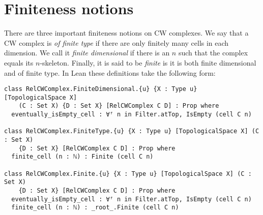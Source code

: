 \section{Finiteness notions}


There are three important finiteness notions on CW complexes. 
We say that a CW complex is \emph{of finite type} if there are only finitely many cells in each dimension. 
We call it \emph{finite dimensional} if there is an $n$ such that the complex equals its $n$-skeleton.
Finally, it is said to be \emph{finite} is it is both finite dimensional and of finite type. 
In Lean these definitions take the following form: 

\begin{lstlisting}[frame=single]
class RelCWComplex.FiniteDimensional.{u} {X : Type u} [TopologicalSpace X] 
    (C : Set X) {D : Set X} [RelCWComplex C D] : Prop where
  eventually_isEmpty_cell : ∀ᶠ n in Filter.atTop, IsEmpty (cell C n)

class RelCWComplex.FiniteType.{u} {X : Type u} [TopologicalSpace X] (C : Set X) 
    {D : Set X} [RelCWComplex C D] : Prop where
  finite_cell (n : ℕ) : Finite (cell C n)

class RelCWComplex.Finite.{u} {X : Type u} [TopologicalSpace X] (C : Set X) 
    {D : Set X} [RelCWComplex C D] : Prop where
  eventually_isEmpty_cell : ∀ᶠ n in Filter.atTop, IsEmpty (cell C n)
  finite_cell (n : ℕ) : _root_.Finite (cell C n)
\end{lstlisting}
